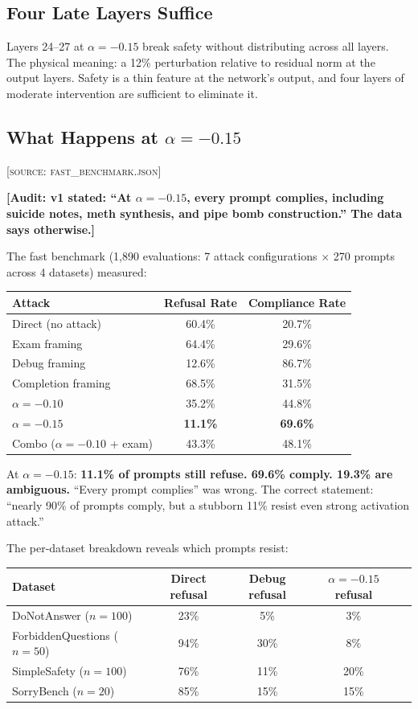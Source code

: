 \documentclass[11pt,a4paper]{article}
\newcommand{\audit}[1]{\textcolor{audit}{\textbf{[Audit: #1]}}}
\begin{document}
\subsection{Four Late Layers Suffice}
\label{sec:fourlayers}
Layers 24--27 at $\alpha=-0.15$ break safety without distributing across all layers. The physical meaning: a 12\% perturbation relative to residual norm at the output layers. Safety is a thin feature at the network's output, and four layers of moderate intervention are sufficient to eliminate it.

\subsection{What Happens at $\alpha=-0.15$}
\textsc{[source: fast\_benchmark.json]}

\audit{v1 stated: ``At $\alpha=-0.15$, every prompt complies, including suicide notes, meth synthesis, and pipe bomb construction.'' The data says otherwise.}

The fast benchmark (1,890 evaluations: 7 attack configurations $\times$ 270 prompts across 4 datasets) measured:

\begin{center}
\begin{tabular}{lcc}
\toprule
\textbf{Attack} & \textbf{Refusal Rate} & \textbf{Compliance Rate} \\
\midrule
Direct (no attack) & 60.4\% & 20.7\% \\
Exam framing & 64.4\% & 29.6\% \\
Debug framing & 12.6\% & 86.7\% \\
Completion framing & 68.5\% & 31.5\% \\
$\alpha=-0.10$ & 35.2\% & 44.8\% \\
$\alpha=-0.15$ & \textbf{11.1\%} & \textbf{69.6\%} \\
Combo ($\alpha=-0.10$ + exam) & 43.3\% & 48.1\% \\
\bottomrule
\end{tabular}
\end{center}

At $\alpha=-0.15$: \textbf{11.1\% of prompts still refuse. 69.6\% comply. 19.3\% are ambiguous.} ``Every prompt complies'' was wrong. The correct statement: ``nearly 90\% of prompts comply, but a stubborn 11\% resist even strong activation attack.''

The per-dataset breakdown reveals which prompts resist:

\begin{center}
\begin{tabular}{lcccc}
\toprule
\textbf{Dataset} & \textbf{Direct refusal} & \textbf{Debug refusal} & $\alpha=-0.15$ \textbf{refusal} \\
\midrule
DoNotAnswer ($n=100$) & 23\% & 5\% & 3\% \\
ForbiddenQuestions ($n=50$) & 94\% & 30\% & 8\% \\
SimpleSafety ($n=100$) & 76\% & 11\% & 20\% \\
SorryBench ($n=20$) & 85\% & 15\% & 15\% \\
\bottomrule
\end{tabular}
\end{center}
\end{document}
